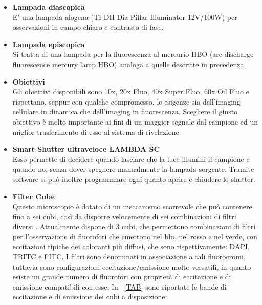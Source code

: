 \begin{itemize}

\item \textbf{Lampada diascopica}\\
E' una lampada alogena (TI-DH Dia Pillar Illuminator 12V/100W) per osservazioni in campo chiaro e contrasto di fase.

\item \textbf{Lampada episcopica} \\
Si tratta di una lampada per la fluorescenza al mercurio HBO (arc-discharge fluorescence mercury lamp HBO) analoga a quelle descritte in precedenza.

\item \textbf{Obiettivi}\\
Gli obiettivi disponibili sono 10x, 20x Fluo, 40x Super Fluo, 60x Oil Fluo e rispettano, seppur con qualche compromesso, le esigenze sia dell'imaging cellulare in dinamica che dell'imaging in fluorescenza. 
Scegliere il giusto obiettivo è molto importante ai fini di un maggior segnale dal campione ed un miglior trasferimento di esso al sistema di rivelazione.

\item \textbf{Smart Shutter ultraveloce LAMBDA SC}\\
Esso permette di decidere quando lasciare che la luce illumini il campione e quando no, senza dover spegnere manualmente la lampada sorgente.
Tramite software si può inoltre programmare ogni quanto aprire e chiudere lo shutter.

\item \textbf{Filter Cube}\\
Questo microscopio è dotato di un meccanismo scorrevole che può contenere fino a sei cubi, così da disporre velocemente di sei combinazioni di filtri diversi \cite{Nikon1}. 
Attualmente dispone di 3 cubi, che permettono combinazioni di filtri per l'osservazione di fluorofori che emettono nel blu, nel rosso e nel verde, con eccitazioni tipiche dei coloranti più diffusi, che sono rispettivamente: DAPI, TRITC e FITC. 
I filtri sono denominati in associazione a tali fluorocromi, tuttavia sono configurazioni eccitazione/emissione molto versatili, in quanto esiste un grande numero di fluorofori con proprietà di eccitazione e di emissione compatibili con esse. 
In \tablename~\ref{TAB} sono riportate le bande di eccitazione e di emissione dei cubi a disposizione:


\end{itemize}
